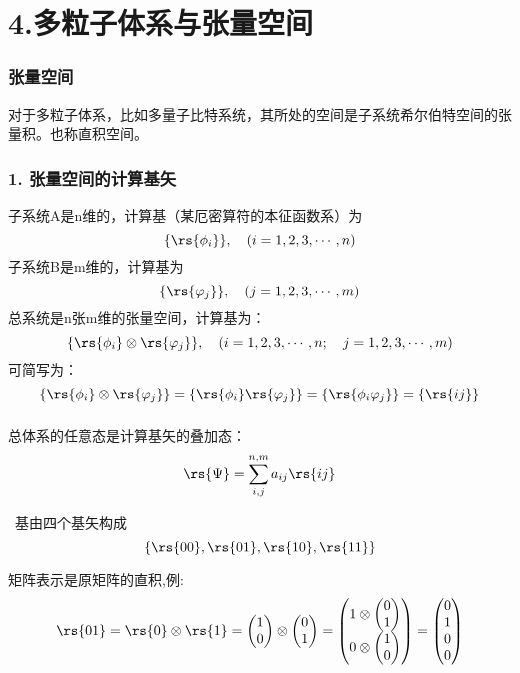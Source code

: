 \section{4.多粒子体系与张量空间}

\begin{frame}
    \frametitle{张量空间}
    \begin{tcolorbox4}[张量积]
    对于多粒子体系，比如多量子比特系统，其所处的空间是子系统希尔伯特空间的张量积。也称直积空间。
    \end{tcolorbox4}
\end{frame}

\begin{frame}
    \frametitle{1. 张量空间的计算基矢}
    子系统A是n维的，计算基（某厄密算符的本征函数系）为$$\{\rs{\phi_i}\},\quad (i=1,2,3,\cdots,n)$$ 
    子系统B是m维的，计算基为$$\{\rs{\varphi_j}\},\quad (j=1,2,3,\cdots,m)$$ 
    总系统是n张m维的张量空间，计算基为：$$\{\rs{\phi_i}\otimes\rs{\varphi_j}\},\quad (i=1,2,3,\cdots,n;\quad j=1,2,3,\cdots,m)$$ 
    可简写为：$$\{\rs{\phi_i}\otimes\rs{\varphi_j}\}=\{\rs{\phi_i}\rs{\varphi_j}\}=\{\rs{\phi_i\varphi_j}\}=\{\rs{ij}\}$$
\end{frame}

\begin{frame}
    \frametitle{}
    总体系的任意态是计算基矢的叠加态：
    \[ \rs{\Psi} = \sum_{i,j} ^{n,m} a_{ij}\rs{ij}\] \vspace{0.6em}

    \例[6. 写出$C^2$空间的张量空间的计算基]{} 
    \解~基由四个基矢构成$$\{\rs{00},\rs{01},\rs{10},\rs{11}\}$$

矩阵表示是原矩阵的直积,例: 
\[\rs{01} = \rs{0} \otimes \rs{1} =    
\begin{pmatrix}
    1\\
    0
\end{pmatrix}
\otimes
\begin{pmatrix}
    0\\
    1
\end{pmatrix}
=
\begin{pmatrix}
    1 \otimes \begin{pmatrix}
        0\\
        1
    \end{pmatrix}\\
    0 \otimes \begin{pmatrix}
        1\\
        0
    \end{pmatrix}
\end{pmatrix}
=
\begin{pmatrix}
    0\\
    1\\
    0\\
    0
\end{pmatrix}
 \] 
\end{frame}


